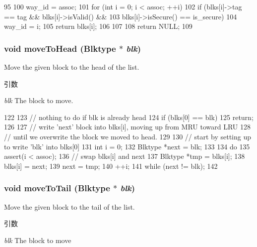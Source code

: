 \begin{DoxyCode}
95 {
100     way_id = assoc;
101     for (int i = 0; i < assoc; ++i) {
102         if (blks[i]->tag == tag && blks[i]->isValid() &&
103             blks[i]->isSecure() == is_secure) {
104             way_id = i;
105             return blks[i];
106         }
107     }
108     return NULL;
109 }
\end{DoxyCode}
\hypertarget{classCacheSet_a36bd3b7504969f977b5f5a9c2d2d5413}{
\subsubsection[{moveToHead}]{\setlength{\rightskip}{0pt plus 5cm}void moveToHead (Blktype $\ast$ {\em blk})}}
\label{classCacheSet_a36bd3b7504969f977b5f5a9c2d2d5413}
Move the given block to the head of the list. 
\begin{DoxyParams}{引数}
\item[{\em blk}]The block to move. \end{DoxyParams}



\begin{DoxyCode}
122 {
123     // nothing to do if blk is already head
124     if (blks[0] == blk)
125         return;
126 
127     // write 'next' block into blks[i], moving up from MRU toward LRU
128     // until we overwrite the block we moved to head.
129 
130     // start by setting up to write 'blk' into blks[0]
131     int i = 0;
132     Blktype *next = blk;
133 
134     do {
135         assert(i < assoc);
136         // swap blks[i] and next
137         Blktype *tmp = blks[i];
138         blks[i] = next;
139         next = tmp;
140         ++i;
141     } while (next != blk);
142 }
\end{DoxyCode}
\hypertarget{classCacheSet_abac25ca30812f3e15af829d389845946}{
\subsubsection[{moveToTail}]{\setlength{\rightskip}{0pt plus 5cm}void moveToTail (Blktype $\ast$ {\em blk})}}
\label{classCacheSet_abac25ca30812f3e15af829d389845946}
Move the given block to the tail of the list. 
\begin{DoxyParams}{引数}
\item[{\em blk}]The block to move \end{DoxyParams}




